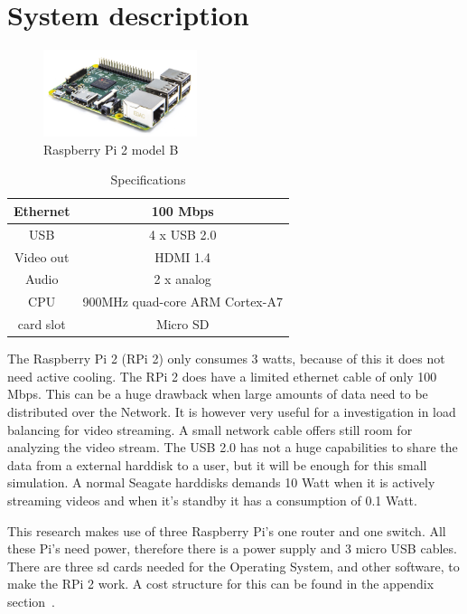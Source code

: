 \documentclass{sig-alternate-br}
\begin{document}
\section{System description}\label{sec:system}

\begin{figure}[H]
	\centering 
	\includegraphics[width=0.4\textwidth]{Pi2ModB1GB_-comp.jpeg}
	\caption{Raspberry Pi 2 model B}
	\label{fig:raspberry} %
\end{figure}
\begin{table}[H]
	\centering \caption{Specifications}
	\begin{tabular}{|c|c|} \hline
		Ethernet & 100 Mbps \\ \hline
		USB & 4 x USB 2.0 \\ \hline
		Video out & HDMI 1.4 \\ \hline
		Audio & 2 x analog \\ \hline
		CPU & 900MHz quad-core ARM Cortex-A7 \\ \hline
		card slot & Micro SD  \\ \hline
	\end{tabular}
	\label{tab:Specificaties}
\end{table}
The Raspberry Pi 2 (RPi 2) only consumes 3 watts, because of this it does not need active cooling. The RPi 2 does have a limited ethernet cable of only 100 Mbps. This can be a huge drawback when large amounts of data need to be distributed over the Network. It is however very useful for a investigation in load balancing for video streaming. A small network cable offers still room for analyzing the video stream. The USB 2.0 has not a huge capabilities to share the data from a external harddisk to a user, but it will be enough for this small simulation. A normal Seagate harddisks demands 10 Watt when it is actively streaming videos and when it's standby it has a consumption of 0.1  Watt.

This research makes use of three Raspberry Pi's one router and one switch. All these Pi's need power, therefore there is a power supply and 3 micro USB cables. There are three sd cards needed for the Operating System, and other software, to make the RPi 2 work. A cost structure for this can be found in the appendix section~.
\end{document}
